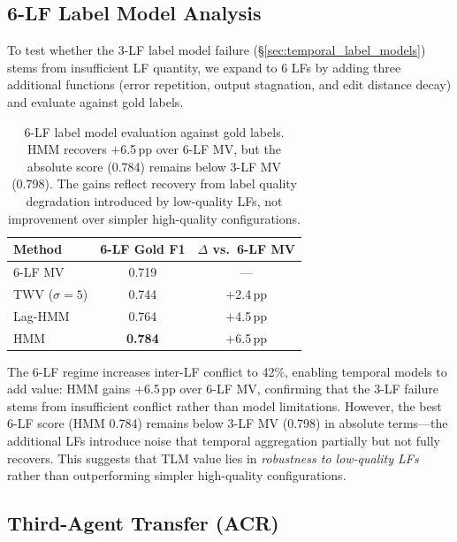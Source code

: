 \subsection{6-LF Label Model Analysis}
\label{sec:app_6lf}

To test whether the 3-LF label model failure (\S\ref{sec:temporal_label_models}) stems from insufficient LF quantity, we expand to 6 LFs by adding three additional functions (error repetition, output stagnation, and edit distance decay) and evaluate against gold labels.

\begin{table}[h]
\centering
\small
\begin{tabular}{lcc}
\toprule
\textbf{Method} & \textbf{6-LF Gold F1} & $\Delta$ \textbf{vs.\ 6-LF MV} \\
\midrule
6-LF MV & 0.719 & --- \\
TWV ($\sigma{=}5$) & 0.744 & $+$2.4\,pp \\
Lag-HMM & 0.764 & $+$4.5\,pp \\
HMM & \textbf{0.784} & $+$6.5\,pp \\
\bottomrule
\end{tabular}
\caption{6-LF label model evaluation against gold labels. HMM recovers $+$6.5\,pp over 6-LF MV, but the absolute score (0.784) remains below 3-LF MV (0.798). The gains reflect recovery from label quality degradation introduced by low-quality LFs, not improvement over simpler high-quality configurations.}
\label{tab:6lf_tlm}
\end{table}

The 6-LF regime increases inter-LF conflict to 42\%, enabling temporal models to add value: HMM gains $+$6.5\,pp over 6-LF MV, confirming that the 3-LF failure stems from insufficient conflict rather than model limitations.
However, the best 6-LF score (HMM 0.784) remains below 3-LF MV (0.798) in absolute terms---the additional LFs introduce noise that temporal aggregation partially but not fully recovers.
This suggests that TLM value lies in \emph{robustness to low-quality LFs} rather than outperforming simpler high-quality configurations.

\subsection{Third-Agent Transfer (ACR)}
\label{sec:app_acr}

